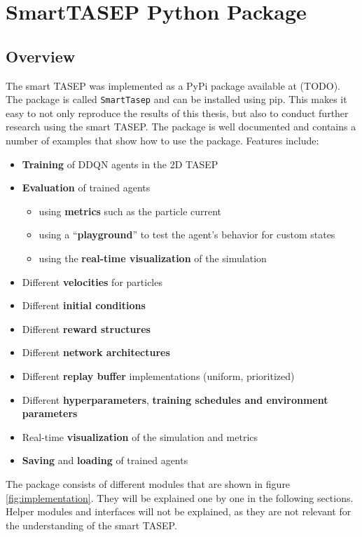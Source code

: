   
\section{SmartTASEP Python Package}
\subsection{Overview}
\label{subsec:implementation-overview}
The smart TASEP was implemented as a PyPi package available at (TODO). The package is called \texttt{SmartTasep} and can be installed using pip. This makes it easy to not only reproduce the results of this thesis, but also to conduct further research using the smart TASEP. The package is well documented and contains a number of examples that show how to use the package. Features include:
\begin{itemize}
    \item \textbf{Training} of DDQN agents in the 2D TASEP
    \item \textbf{Evaluation} of trained agents
    \begin{itemize}
        \item using \textbf{metrics} such as the particle current
        \item using a \enquote{\textbf{playground}} to test the agent's behavior for custom states
        \item using the \textbf{real-time visualization} of the simulation
    \end{itemize} 
    \item Different \textbf{velocities} for particles
    \item Different \textbf{initial conditions}
    \item Different \textbf{reward structures}
    \item Different \textbf{network architectures}
    \item Different \textbf{replay buffer} implementations (uniform, prioritized)
    \item Different \textbf{hyperparameters}, \textbf{training schedules and environment parameters}
    \item Real-time \textbf{visualization} of the simulation and metrics
    \item \textbf{Saving} and \textbf{loading} of trained agents
\end{itemize}
The package consists of different modules that are shown in figure \ref{fig:implementation}. They will be explained one by one in the following sections. Helper modules and interfaces will not be explained, as they are not relevant for the understanding of the smart TASEP. 

